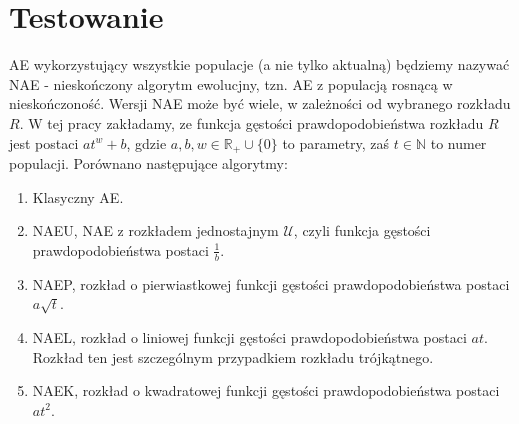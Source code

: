 \documentclass[12pt, a4paper]{article}
\begin{document}
\section{Testowanie}

AE wykorzystujący wszystkie populacje (a nie tylko aktualną) będziemy nazywać NAE - nieskończony algorytm ewolucjny, 
tzn. AE z populacją rosnącą w nieskończoność.
Wersji NAE może być wiele, w zależności od wybranego rozkładu $R$. 
W tej pracy zakładamy, ze funkcja gęstości prawdopodobieństwa rozkładu $R$ jest postaci $at^w + b$, gdzie
$a, b, w \in \mathbb{R_+} \cup \{0\}$ to parametry, zaś $t \in \mathbb{N}$ to numer populacji. 
Porównano następujące algorytmy:

\begin{enumerate}
 \item Klasyczny AE.
 \item NAEU, NAE z rozkładem jednostajnym $\mathcal{U}$, czyli funkcja gęstości prawdopodobieństwa postaci $\frac{1}{b}$. 
 \item NAEP, rozkład o pierwiastkowej funkcji gęstości prawdopodobieństwa postaci $a\sqrt{t}$.
 \item NAEL, rozkład o liniowej funkcji gęstości prawdopodobieństwa postaci $at$. Rozkład ten jest szczególnym przypadkiem
rozkładu trójkątnego.
 \item NAEK, rozkład o kwadratowej funkcji gęstości prawdopodobieństwa postaci $at^2$.
\end{enumerate}
\end{document}
